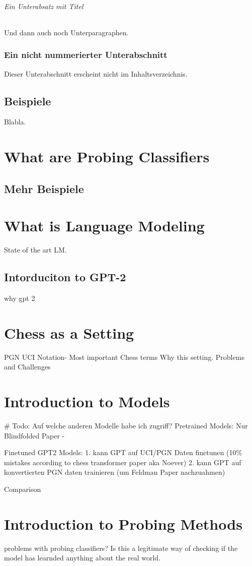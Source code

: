 \documentclass[11pt,a4paper,twoside,openright]{scrbook}
\begin{document}
\subparagraph{Ein Unterabsatz mit Titel}
Und dann auch noch Unterparagraphen.

\subsection*{Ein nicht nummerierter Unterabschnitt}
Dieser Unterabschnitt erscheint nicht im Inhaltsverzeichnis.
\newpage

\section{Beispiele}
Blabla.
\newpage

\chapter{What are Probing Classifiers}
\section{Mehr Beispiele}
\chapter{What is Language Modeling}
State of the art LM.
\section{Intorduciton to GPT-2}
why gpt 2
\chapter{Chess as a Setting}
PGN UCI Notation- Most important Chess terms
Why this setting. Problems and Challenges
\chapter{Introduction to Models}
# Todo: Auf welche anderen Modelle habe ich zugriff?
Pretrained Models:
Nur Blindfolded Paper -

Finetuned GPT2 Models:
1. kann GPT auf UCI/PGN Daten finetunen (10\% mistakes according to chess transformer paper aka Noever)
2. kann GPT auf konvertierten PGN daten trainieren (um Feldman Paper nachzuahmen)

Comparison
\chapter{Introduction to Probing Methods}
problems with probing classifiers? Is this a legitimate way of checking if the model has learnded anything about the real world.
\end{document}

